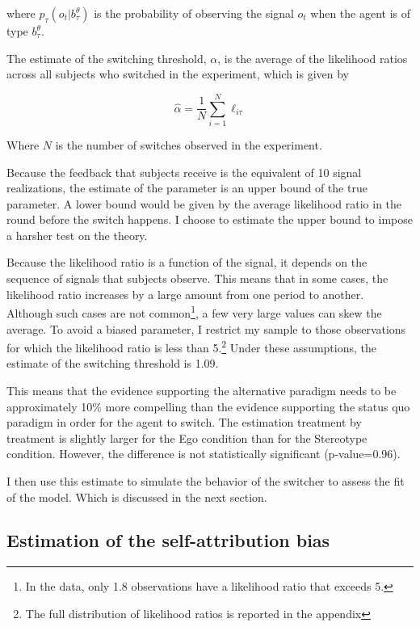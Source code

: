 \documentclass[
  12pt,
]{article}
\begin{document}
where \(p_\tau(o_t|b_{\tau}^\theta)\) is the probability of observing
the signal \(o_t\) when the agent is of type \(b_{\tau}^\theta\).

The estimate of the switching threshold, \(\alpha\), is the average of
the likelihood ratios across all subjects who switched in the
experiment, which is given by

\[\hat{\alpha} = \frac{1}{N}\sum_{i=1}^N \ell_{i\tau}\]

Where \(N\) is the number of switches observed in the experiment.

Because the feedback that subjects receive is the equivalent of 10
signal realizations, the estimate of the parameter is an upper bound of
the true parameter. A lower bound would be given by the average
likelihood ratio in the round before the switch happens. I choose to
estimate the upper bound to impose a harsher test on the theory.

Because the likelihood ratio is a function of the signal, it depends on
the sequence of signals that subjects observe. This means that in some
cases, the likelihood ratio increases by a large amount from one period
to another. Although such cases are not
common\footnote{In the data, only 1.8%
observations have a likelihood ratio that exceeds 5.}, a few very large
values can skew the average. To avoid a biased parameter, I restrict my
sample to those observations for which the likelihood ratio is less than
5.\footnote{The full distribution of likelihood ratios is reported in the appendix}
Under these assumptions, the estimate of the switching threshold is
1.09.

This means that the evidence supporting the alternative paradigm needs
to be approximately 10\% more compelling than the evidence supporting
the status quo paradigm in order for the agent to switch. The estimation
treatment by treatment is slightly larger for the Ego condition than for
the Stereotype condition. However, the difference is not statistically
significant (p-value=0.96).

I then use this estimate to simulate the behavior of the switcher to
assess the fit of the model. Which is discussed in the next section.

\hypertarget{estimation-of-the-self-attribution-bias}{%
\subsection{Estimation of the self-attribution
bias}\label{estimation-of-the-self-attribution-bias}}
\end{document}
